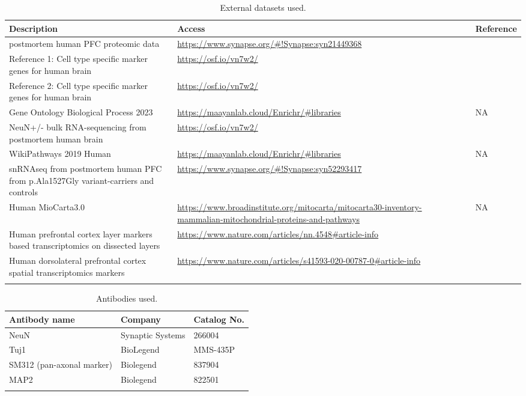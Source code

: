 \documentclass[12pt]{article}
\begin{document}
\clearpage
\begin{longtable}{p{7cm} p{7cm} p{3cm}}
    \caption{External datasets used.}
    \hline
    \textbf{Description} & \textbf{Access} & \textbf{Reference} \\ 
    \hline
    \hline
    postmortem human PFC proteomic data & \url{https://www.synapse.org/\#!Synapse:syn21449368} & \cite{Johnson2020-ib} \\
    \hline
    Reference 1: Cell type specific marker genes for human brain & \url{https://osf.io/vn7w2/} & \cite{Wang2018-im} \\
    \hline
    Reference 2: Cell type specific marker genes for human brain & \url{https://osf.io/vn7w2/} & \cite{Franzen2019-hh} \\
    \hline
    Gene Ontology Biological Process 2023 & \url{https://maayanlab.cloud/Enrichr/\#libraries} & NA \\
    \hline
    NeuN+/- bulk RNA-sequencing from postmortem human brain & \url{https://osf.io/vn7w2/} & \cite{Welch2022-ef} \\
    \hline
    WikiPathways 2019 Human & \url{https://maayanlab.cloud/Enrichr/\#libraries} & NA \\
    \hline
    snRNAseq from postmortem human PFC from p.Ala1527Gly variant-carriers and controls & \url{https://www.synapse.org/\#!Synapse:syn52293417} & \cite{Mathys2023-rs} \\ 
    \hline
    Human MioCarta3.0 & \url{https://www.broadinstitute.org/mitocarta/mitocarta30-inventory-mammalian-mitochondrial-proteins-and-pathways} & NA \\
    \hline
    Human prefrontal cortex layer markers based transcriptomics on dissected layers & \url{https://www.nature.com/articles/nn.4548#article-info} & \cite{He2017-dq} \\
    \hline
    Human dorsolateral prefrontal cortex spatial transcriptomics markers & \url{https://www.nature.com/articles/s41593-020-00787-0#article-info} & \cite{Maynard2021-mz} \\
    \hline
    \label{tab:external_datasets}
\end{longtable}

\clearpage
\begin{longtable}{p{6cm} p{5cm} p{6cm}}
    \caption{Antibodies used.}
    \hline
    \textbf{Antibody name}                & \textbf{Company}      & \textbf{Catalog No.} \\
    \hline
    \hline
    NeuN                                  & Synaptic Systems      & 266004               \\
    \hline
    Tuj1                                  & BioLegend             & MMS-435P             \\
    \hline
    SM312 (pan-axonal marker)             & Biolegend             & 837904               \\
    \hline
    MAP2                                  & Biolegend             & 822501               \\
    \hline
    \label{tab:antibodies_used}
\end{longtable}
\end{document}

